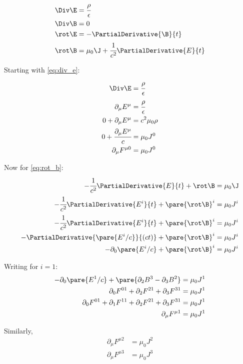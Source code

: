   \begin{align}
    \label{eq:div_e}
    \Div \E &= \cfrac{\rho}{\epsilon} \\
    \label{eq:div_b}
    \Div \B &= 0 \\
    \label{eq:rot_e}
    \rot \E &= -\PartialDerivative{\B}{t} \\
    \label{eq:rot_b}
    \rot \B &= \mu_0 \J + \cfrac{1}{c^2}\PartialDerivative{E}{t}
  \end{align}


  Starting with \autoref{eq:div_e}:
  \begin{align}
    \Div \E &= \cfrac{\rho}{\epsilon} \\
    \partial_\mu E^\mu &= \cfrac{\rho}{\epsilon} \\
    0 + \partial_\mu E^\mu &= c^2\mu_0\rho \\
    0 + \cfrac{\partial_\mu E^\mu}{c} &= \mu_0J^0 \\
    \partial_\mu F^{\mu0} &= \mu_0J^0
  \end{align}

  Now for \autoref{eq:rot_b}:
  \begin{align}
    - \cfrac{1}{c^2}\PartialDerivative{E}{t} + \rot \B &= \mu_0 \J \\
    - \cfrac{1}{c^2}\PartialDerivative{E^i}{t} + \pare{\rot \B}^i &= \mu_0 J^i \\
    - \cfrac{1}{c^2}\PartialDerivative{E^i}{t} + \pare{\rot \B}^i &= \mu_0 J^i \\
    - \PartialDerivative{\pare{E^i/c}}{(ct)} + \pare{\rot \B}^i &= \mu_0 J^i \\
    - \partial_0\pare{E^i/c} + \pare{\rot \B}^i &= \mu_0 J^i
  \end{align}

  Writing for $i = 1$:
  \begin{align}
    - \partial_0\pare{E^1/c} + \pare{\partial_2B^3-\partial_3B^2} &= \mu_0 J^1\\
    \partial_0 F^{01} + \partial_2 F^{21}+\partial_3 F^{31} &= \mu_0 J^1\\
    \partial_0 F^{01} + \partial_1 F^{11} + \partial_2 F^{21}+\partial_3 F^{31} &= \mu_0 J^1\\
    \partial_\mu F^{\mu1} &= \mu_0J^1
  \end{align}

  Similarly,
  \begin{align}
    \partial_\mu F^{\mu2} &= \mu_0J^2 \\
    \partial_\mu F^{\mu3} &= \mu_0J^3
  \end{align}

